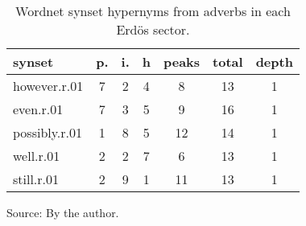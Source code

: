 \begin{table}[h!]
\begin{center}
\caption{Wordnet synset hypernyms from adverbs in each Erd\"os sector.}
	\label{tab:wnrh}
\begin{tabular}{| l || c | c | c || c | c | c |}\hline
{\bf synset} & {\bf p.} & {\bf i.} & {\bf h} & {\bf peaks} & {\bf total} & {\bf depth} \\\hline\hline
however.r.01 & 7  & 2  & 4  & 8  & 13  & 1 \\
even.r.01 & 7  & 3  & 5  & 9  & 16  & 1 \\
possibly.r.01 & 1  & 8  & 5  & 12  & 14  & 1 \\
well.r.01 & 2  & 2  & 7  & 6  & 13  & 1 \\
still.r.01 & 2  & 9  & 1  & 11  & 13  & 1 \\\hline
\end{tabular}
\begin{flushleft}
		Source: By the author.\
\end{flushleft}
\end{center}
\end{table}

